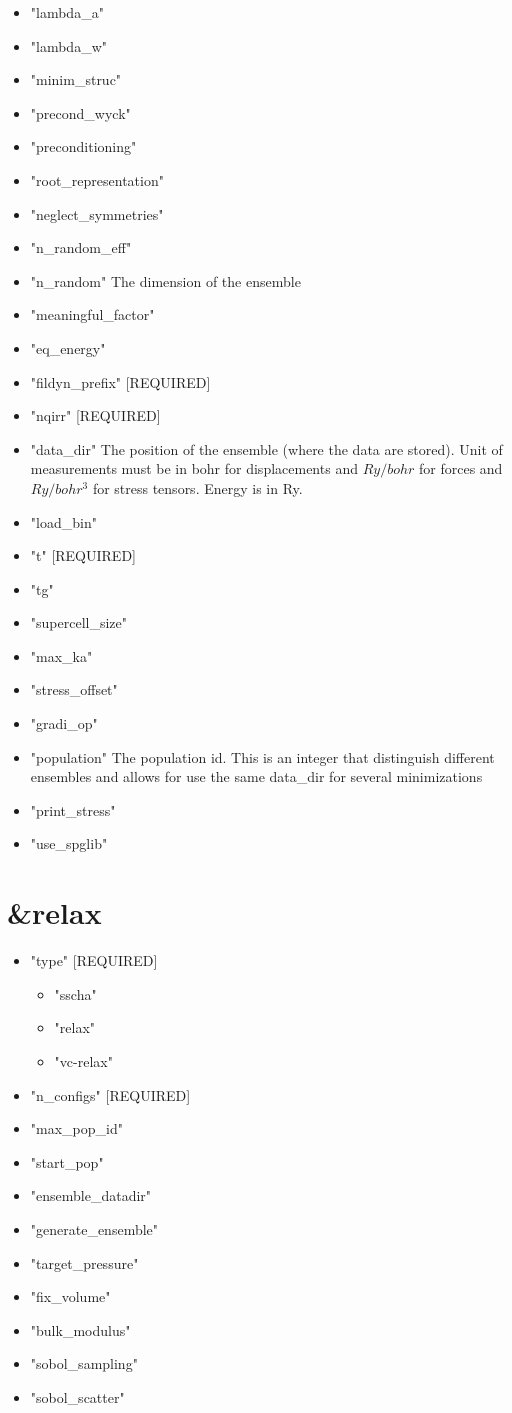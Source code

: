 \documentclass[]{scrartcl}
\begin{document}
\begin{itemize}
	\item "lambda\_a"
	\item "lambda\_w"
	\item "minim\_struc"
	\item "precond\_wyck"
	\item "preconditioning"
	\item "root\_representation"
	\item "neglect\_symmetries"
	\item "n\_random\_eff"
	\item "n\_random"
	The dimension of the ensemble
	\item "meaningful\_factor"
	\item "eq\_energy"
	\item "fildyn\_prefix" [REQUIRED]
	\item "nqirr" [REQUIRED]
	\item "data\_dir"
	The position of the ensemble (where the data are stored). Unit of measurements must be in bohr for displacements and $Ry/bohr$ for forces and $Ry/bohr^3$ for stress tensors. Energy is in Ry.
	\item "load\_bin"
	\item "t" [REQUIRED]
	\item "tg"
	\item "supercell\_size"
	\item "max\_ka"
	\item "stress\_offset"
	\item "gradi\_op"
	\item "population"
	The population id. This is an integer that distinguish different ensembles and allows for use the same data\_dir for several minimizations
	\item "print\_stress"
	\item "use\_spglib"
\end{itemize}
\section{\&relax}
\begin{itemize}
	\item "type" [REQUIRED]
	\begin{itemize}
		\item "sscha"
		\item "relax"	
		\item "vc-relax"
	\end{itemize}
	\item "n\_configs" [REQUIRED]
	\item "max\_pop\_id"
	\item "start\_pop"
	\item "ensemble\_datadir"
	\item "generate\_ensemble"
	\item "target\_pressure"
	\item "fix\_volume"
	\item "bulk\_modulus"
	\item "sobol\_sampling"
	\item "sobol\_scatter"
\end{itemize}
\end{document}
